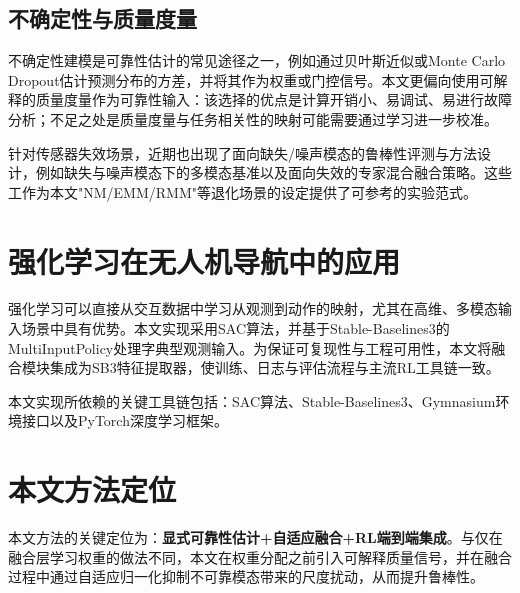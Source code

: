 \subsection{不确定性与质量度量}
不确定性建模是可靠性估计的常见途径之一，例如通过贝叶斯近似或Monte Carlo Dropout估计预测分布的方差，并将其作为权重或门控信号。本文更偏向使用可解释的质量度量作为可靠性输入：该选择的优点是计算开销小、易调试、易进行故障分析；不足之处是质量度量与任务相关性的映射可能需要通过学习进一步校准。

针对传感器失效场景，近期也出现了面向缺失/噪声模态的鲁棒性评测与方法设计，例如缺失与噪声模态下的多模态基准\cite{liao2025benchmarkingmultimodalsemanticsegmentation}以及面向失效的专家混合融合策略\cite{park2025resilientsensorfusionadverse}。这些工作为本文"NM/EMM/RMM"等退化场景的设定提供了可参考的实验范式。

\section{强化学习在无人机导航中的应用}
强化学习可以直接从交互数据中学习从观测到动作的映射，尤其在高维、多模态输入场景中具有优势。本文实现采用SAC算法，并基于Stable-Baselines3的MultiInputPolicy处理字典型观测输入。为保证可复现性与工程可用性，本文将融合模块集成为SB3特征提取器，使训练、日志与评估流程与主流RL工具链一致。

本文实现所依赖的关键工具链包括：SAC算法\cite{haarnoja2018sac}、Stable-Baselines3\cite{raffin2021sb3}、Gymnasium环境接口\cite{gymnasium2023}以及PyTorch深度学习框架\cite{paszke2019pytorch}。

\section{本文方法定位}
本文方法的关键定位为：\textbf{显式可靠性估计+自适应融合+RL端到端集成}。与仅在融合层学习权重的做法不同，本文在权重分配之前引入可解释质量信号，并在融合过程中通过自适应归一化抑制不可靠模态带来的尺度扰动，从而提升鲁棒性。

